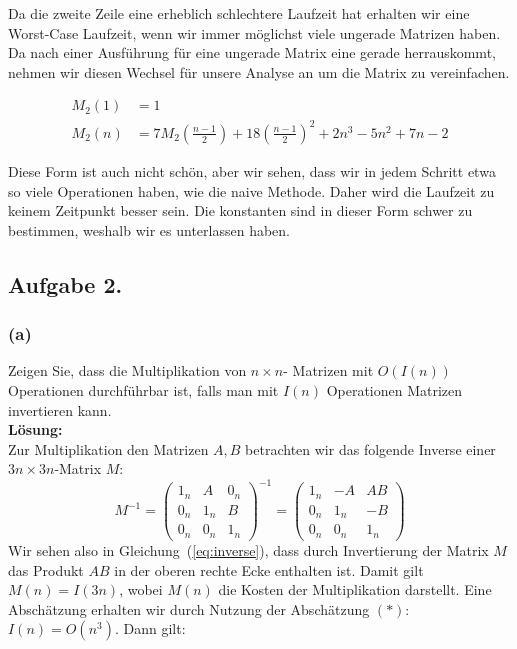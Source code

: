 \documentclass[11pt,a4paper,ngerman]{article}
\begin{document}
Da die zweite Zeile eine erheblich schlechtere Laufzeit hat erhalten wir eine Worst-Case Laufzeit, wenn wir immer
möglichst viele ungerade Matrizen haben. Da nach einer Ausführung für eine ungerade Matrix eine gerade herrauskommt,
nehmen wir diesen Wechsel für unsere Analyse an um die Matrix zu vereinfachen.

\begin{equation*}\begin{split}
M_2(1) &= 1\\
M_2(n) &= 7M_2(\frac{n-1}{2}) + 18(\frac{n-1}{2})^2 + 2n^3 - 5n^2+7n-2
\end{split}\end{equation*}

Diese Form ist auch nicht schön, aber wir sehen, dass wir in jedem Schritt etwa so viele Operationen haben, wie die naive Methode.
Daher wird die Laufzeit zu keinem Zeitpunkt besser sein. Die konstanten sind in dieser Form schwer zu bestimmen, weshalb wir es unterlassen
haben.

\subsection*{Aufgabe 2.}

\subsubsection*{(a)}

Zeigen Sie, dass die Multiplikation von $n \times n$- Matrizen mit $O(I(n))$ Operationen durchführbar ist, falls man mit $I(n)$ Operationen Matrizen invertieren kann.\\

\textbf{Lösung:}\\
Zur Multiplikation den Matrizen $A,B$ betrachten wir das folgende Inverse einer $3n \times 3n$-Matrix $M$:
\begin{equation}\label{eq:inverse}
  M^{-1} = \left(\begin{array}{ccc}
              1_n & A   & 0_n \\
              0_n & 1_n & B \\
              0_n & 0_n & 1_n
           \end{array}\right)^{-1}
         = \left(\begin{array}{ccc}
              1_n & -A   & AB \\
              0_n & 1_n & -B \\
              0_n & 0_n & 1_n
           \end{array}\right)
\end{equation}
Wir sehen also in Gleichung~(\ref{eq:inverse}), dass durch Invertierung der Matrix $M$ das Produkt $AB$
in der oberen rechte Ecke enthalten ist. Damit gilt $M(n) = I(3n)$, wobei $M(n)$ die Kosten der Multiplikation
darstellt.
Eine Abschätzung erhalten wir durch Nutzung der Abschätzung $(*)$: $I(n) = O(n^3)$. Dann gilt:
\end{document}
